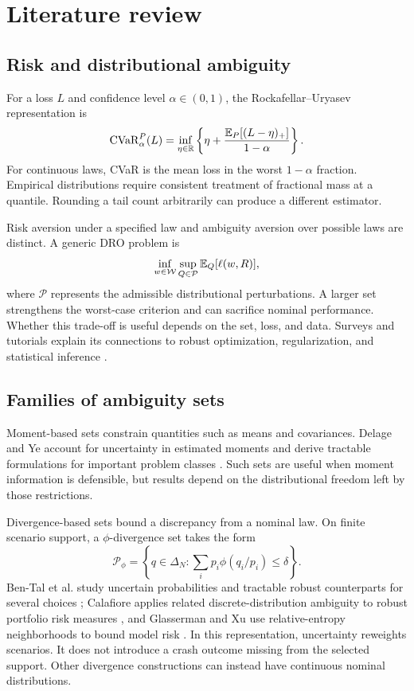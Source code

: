 \section{Literature review}
\subsection{Risk and distributional ambiguity}
For a loss $L$ and confidence level $\alpha\in(0,1)$, the Rockafellar--Uryasev representation is
\begin{equation}
\operatorname{CVaR}_\alpha^P(L)=\inf_{\eta\in\mathbb{R}}\left\{\eta+\frac{\mathbb{E}_P[(L-\eta)_+]}{1-\alpha}\right\}.
\label{eq:cvar}
\end{equation}
For continuous laws, CVaR is the mean loss in the worst $1-\alpha$ fraction. Empirical distributions require consistent treatment of fractional mass at a quantile. Rounding a tail count arbitrarily can produce a different estimator.

Risk aversion under a specified law and ambiguity aversion over possible laws are distinct. A generic DRO problem is
\begin{equation}
\inf_{w\in\mathcal{W}}\sup_{Q\in\mathcal P}\mathbb{E}_Q[\ell(w,R)],
\end{equation}
where $\mathcal P$ represents the admissible distributional perturbations. A larger set strengthens the worst-case criterion and can sacrifice nominal performance. Whether this trade-off is useful depends on the set, loss, and data. Surveys and tutorials explain its connections to robust optimization, regularization, and statistical inference \cite{rahimian,kuhn,kuhntutorial}.

\subsection{Families of ambiguity sets}
\label{sec:families}
Moment-based sets constrain quantities such as means and covariances. Delage and Ye account for uncertainty in estimated moments and derive tractable formulations for important problem classes \cite{delage}. Such sets are useful when moment information is defensible, but results depend on the distributional freedom left by those restrictions.

Divergence-based sets bound a discrepancy from a nominal law. On finite scenario support, a $\phi$-divergence set takes the form
\begin{equation}
\mathcal P_\phi=\left\{q\in\Delta_N:\sum_i p_i\phi(q_i/p_i)\leq\delta\right\}.
\end{equation}
Ben-Tal et al. study uncertain probabilities and tractable robust counterparts for several choices \cite{bental}; Calafiore applies related discrete-distribution ambiguity to robust portfolio risk measures \cite{calafiore}, and Glasserman and Xu use relative-entropy neighborhoods to bound model risk \cite{glasserman}. In this representation, uncertainty reweights scenarios. It does not introduce a crash outcome missing from the selected support. Other divergence constructions can instead have continuous nominal distributions.

